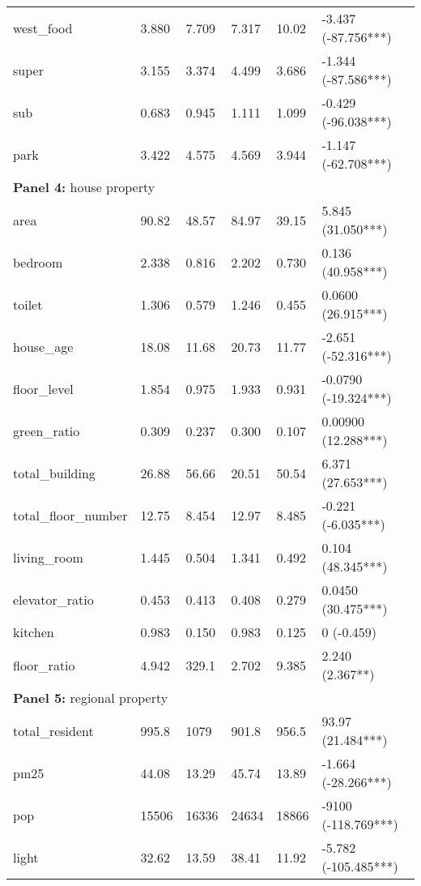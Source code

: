 \begin{tabular}{llllll}
west\_food & 3.880 & 7.709 & 7.317 & 10.02 & -3.437 (-87.756***) \\
super & 3.155 & 3.374 & 4.499 & 3.686 & -1.344 (-87.586***) \\
sub & 0.683 & 0.945 & 1.111 & 1.099 & -0.429 (-96.038***) \\
park & 3.422 & 4.575 & 4.569 & 3.944 & -1.147 (-62.708***) \\
\multicolumn{6}{l}{\textbf{Panel 4: }house property} \\
area & 90.82 & 48.57 & 84.97 & 39.15 & 5.845 (31.050***) \\
bedroom & 2.338 & 0.816 & 2.202 & 0.730 & 0.136 (40.958***) \\
toilet & 1.306 & 0.579 & 1.246 & 0.455 & 0.0600 (26.915***) \\
house\_age & 18.08 & 11.68 & 20.73 & 11.77 & -2.651 (-52.316***) \\
floor\_level & 1.854 & 0.975 & 1.933 & 0.931 & -0.0790 (-19.324***) \\
green\_ratio & 0.309 & 0.237 & 0.300 & 0.107 & 0.00900 (12.288***) \\
total\_building & 26.88 & 56.66 & 20.51 & 50.54 & 6.371 (27.653***) \\
total\_floor\_number & 12.75 & 8.454 & 12.97 & 8.485 & -0.221 (-6.035***) \\
living\_room & 1.445 & 0.504 & 1.341 & 0.492 & 0.104 (48.345***) \\
elevator\_ratio & 0.453 & 0.413 & 0.408 & 0.279 & 0.0450 (30.475***) \\
kitchen & 0.983 & 0.150 & 0.983 & 0.125 & 0 (-0.459) \\
floor\_ratio & 4.942 & 329.1 & 2.702 & 9.385 & 2.240 (2.367**) \\
\multicolumn{6}{l}{\textbf{Panel 5: }regional property} \\
total\_resident & 995.8 & 1079 & 901.8 & 956.5 & 93.97 (21.484***) \\
pm25 & 44.08 & 13.29 & 45.74 & 13.89 & -1.664 (-28.266***) \\
pop & 15506 & 16336 & 24634 & 18866 & -9100 (-118.769***) \\
light & 32.62 & 13.59 & 38.41 & 11.92 & -5.782 (-105.485***) \\
\bottomrule
\end{tabular}
